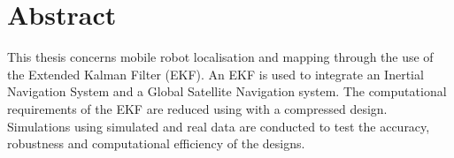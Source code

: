 \chapter*{Abstract}
\vspace{-1em}
This thesis concerns mobile robot localisation and mapping through the use of the Extended Kalman Filter (EKF). An EKF is used to integrate an Inertial Navigation System and a Global Satellite Navigation system. The computational requirements of the EKF are reduced using with a compressed design. Simulations using simulated and real data are conducted to test the accuracy, robustness and computational efficiency of the designs.
